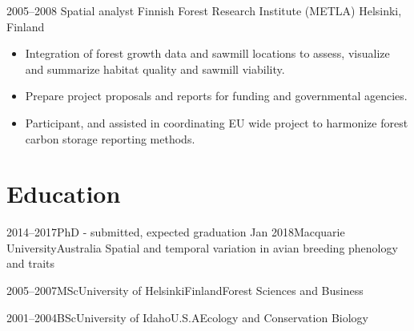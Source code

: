 \documentclass[11pt,a4paper,sans]{moderncv}        %
\begin{document}
\cventry
  {2005--2008}
  {Spatial analyst}
  {Finnish Forest Research Institute (METLA)}
  {Helsinki, Finland}
  {}
  {\begin{itemize}
  \item Integration of forest growth data and sawmill locations to assess, visualize and summarize habitat quality and sawmill viability. 
  \item Prepare project proposals and reports for funding and governmental agencies.
  \item Participant, and assisted in coordinating EU wide project to harmonize forest carbon storage reporting methods. 
  \end{itemize}
  }

\section{Education}

\cventry
    {2014--2017}{PhD - submitted, expected graduation Jan 2018}{Macquarie University}{Australia}
    {Spatial and temporal variation in avian breeding phenology and traits}{}
    
\cventry
    {2005--2007}{MSc}{University of Helsinki}{Finland}{Forest Sciences and Business}{}

\cventry
    {2001--2004}{BSc}{University of Idaho}{U.S.A}{Ecology and Conservation Biology}{}

% 
% 
\end{document}
